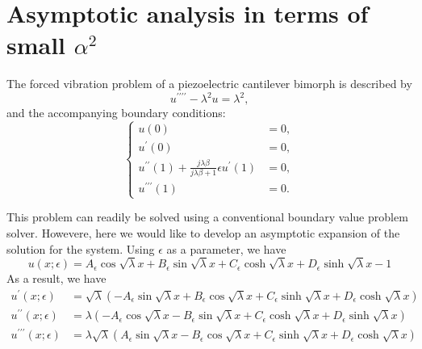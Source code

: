 \documentclass{article}
\begin{document}
\newpage
\section{Asymptotic analysis in terms of small $\alpha^2$}
The forced vibration problem of a piezoelectric cantilever bimorph is described by
\begin{equation}
    u^{\prime\prime\prime\prime} - \lambda^2 u = \lambda^2,
\end{equation}
and the accompanying boundary conditions:
\begin{equation}
    \left\{\begin{aligned}
        u(0) &= 0, \\
        u^\prime(0) &= 0, \\
        u^{\prime\prime}(1) + \frac{j\lambda \beta }{ j\lambda \beta + 1 } \epsilon u^\prime(1) &= 0, \\
        u^{\prime\prime\prime}(1) &= 0.
    \end{aligned}\right.
\end{equation}

This problem can readily be solved using a conventional boundary value problem solver. Howevere, here we would like to develop an asymptotic expansion of the solution for the system. Using $\epsilon$ as a parameter, we have
\begin{equation}
    u(x;\epsilon) = A_\epsilon \cos{\sqrt{\lambda}x} + B_\epsilon \sin{\sqrt{\lambda}x} + C_\epsilon \cosh{\sqrt{\lambda}x} + D_\epsilon \sinh{\sqrt{\lambda}x} - 1
\end{equation}
As a result, we have
\begin{equation}
    \begin{aligned}
        u^{\prime}(x;\epsilon) &= \sqrt{\lambda} \left( - A_\epsilon \sin{\sqrt{\lambda}x} + B_\epsilon \cos{\sqrt{\lambda}x} + C_\epsilon \sinh{\sqrt{\lambda}x} + D_\epsilon \cosh{\sqrt{\lambda}x} \right) \\
        u^{\prime\prime}(x;\epsilon) &= \lambda \left( - A_\epsilon \cos{\sqrt{\lambda}x} - B_\epsilon \sin{\sqrt{\lambda}x} + C_\epsilon \cosh{\sqrt{\lambda}x} + D_\epsilon \sinh{\sqrt{\lambda}x} \right) \\
        u^{\prime\prime\prime}(x;\epsilon) &= \lambda \sqrt{\lambda} \left( A_\epsilon \sin{\sqrt{\lambda}x} - B_\epsilon \cos{\sqrt{\lambda}x} + C_\epsilon \sinh{\sqrt{\lambda}x} + D_\epsilon \cosh{\sqrt{\lambda}x} \right) \\
    \end{aligned}
\end{equation}
\end{document}
